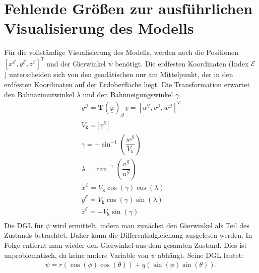 \section{Fehlende Größen zur ausführlichen Visualisierung des Modells}
\label{sec:Visialisis}
Für die vollständige Visualisierung des Modells, werden noch die Positionen $[x^\mathcal{E},y^\mathcal{E},z^\mathcal{E}]^T$ und der Gierwinkel $\psi$ benötigt. Die erdfesten Koordinaten (Index $\mathcal{E}$) unterscheiden sich von den geodätischen nur am Mittelpunkt, der in den erdfesten Koordinaten auf der Erdoberfläche liegt. Die Transformation erwartet den Bahnazimutwinkel $\lambda$ und den Bahnneigungswinkel $\gamma$.
\begin{align}
\underline{v}^\mathcal{G} = \textbf{T}(\underline{\varphi})_\mathrm{gf}\underline{v} = [u^\mathcal{G},v^\mathcal{G},w^\mathcal{G}]^T\\
V_\mathrm{k} = |\underline{v}^\mathcal{G}|\\
\gamma = -\sin^{-1}(\dfrac{w^\mathcal{G}}{V_\mathrm{k}})\\
\lambda = \tan^{-1}(\dfrac{v^\mathcal{G}}{u^\mathcal{G}})\\
\dot{x}^\mathcal{E} = V_\mathrm{k}\cos(\gamma)\cos(\lambda)\\
\dot{y}^\mathcal{E} = V_\mathrm{k}\cos(\gamma)\sin(\lambda)\\
\dot{z}^\mathcal{E} = -V_\mathrm{k}\sin(\gamma)\\
\end{align}
Die DGL für $\psi$ wird ermittelt, indem man zunächst den Gierwinkel als Teil des Zustands betrachtet. Daher kann die Differentialgleichung ausgelesen werden. In Folge entfernt man wieder den Gierwinkel aus dem gesamten Zustand. Dies ist unproblematisch, da keine andere Variable von $\psi$ abhängt. Seine DGL lautet:
\begin{equation}
\dot{\psi} = r(\cos(\phi)\cos(\theta)) + q(\sin(\phi)\sin(\theta)).
\end{equation}

